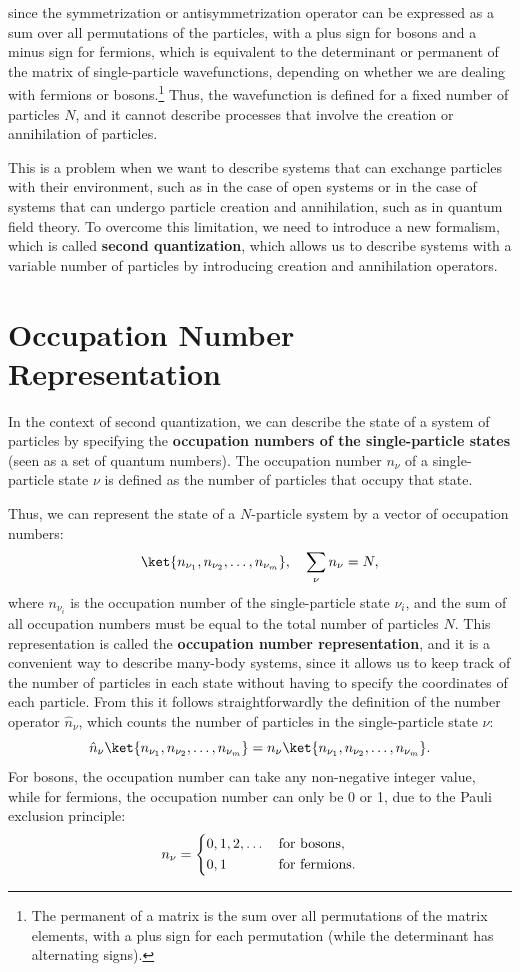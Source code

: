 since the symmetrization or antisymmetrization operator can be expressed as a sum over all permutations of the particles, with a plus sign for bosons and a minus sign for fermions, which is equivalent to the determinant or permanent of the matrix of single-particle wavefunctions, depending on whether we are dealing with fermions or bosons.\footnote{The permanent of a matrix is the sum over all permutations of the matrix elements, with a plus sign for each permutation (while the determinant has alternating signs).} Thus, the wavefunction is defined for a fixed number of particles \(N\), and it cannot describe processes that involve the creation or annihilation of particles.

This is a problem when we want to describe systems that can exchange particles with their environment, such as in the case of open systems or in the case of systems that can undergo particle creation and annihilation, such as in quantum field theory. To overcome this limitation, we need to introduce a new formalism, which is called \textbf{second quantization}, which allows us to describe systems with a variable number of particles by introducing creation and annihilation operators.

\section{Occupation Number Representation}

In the context of second quantization, we can describe the state of a system of particles by specifying the \textbf{occupation numbers of the single-particle states} (seen as a set of quantum numbers). The occupation number \(n_\nu\) of a single-particle state \(\nu\) is defined as the number of particles that occupy that state.

Thus, we can represent the state of a \(N\)-particle system by a vector of occupation numbers:
\[
    \ket{n_{\nu_1}, n_{\nu_2}, \dots, n_{\nu_m}}, \quad \sum_{\nu} n_\nu = N,
\]
where \(n_{\nu_i}\) is the occupation number of the single-particle state \(\nu_i\), and the sum of all occupation numbers must be equal to the total number of particles \(N\). This representation is called the \textbf{occupation number representation}, and it is a convenient way to describe many-body systems, since it allows us to keep track of the number of particles in each state without having to specify the coordinates of each particle. From this it follows straightforwardly the definition of the number operator \(\hat{n}_\nu\), which counts the number of particles in the single-particle state \(\nu\):
\[
    \hat{n}_\nu \ket{n_{\nu_1}, n_{\nu_2}, \dots, n_{\nu_m}} = n_\nu \ket{n_{\nu_1}, n_{\nu_2}, \dots, n_{\nu_m}}.
\]
For bosons, the occupation number can take any non-negative integer value, while for fermions, the occupation number can only be 0 or 1, due to the Pauli exclusion principle:
\[
    n_\nu = \begin{dcases}
        0, 1, 2, \dots & \text{for bosons},   \\
        0, 1           & \text{for fermions}.
    \end{dcases}
\]

